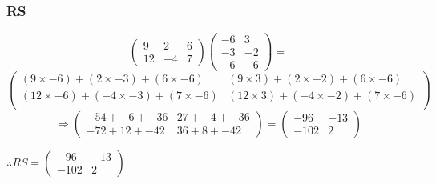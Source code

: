 \documentclass{article}
\begin{document}
\subsubsection{RS}
\[
	\begin{pmatrix}
		9 & 2 & 6\\
		12 & -4 & 7
	\end{pmatrix}
	\begin{pmatrix}
		-6 & 3\\
		-3 & -2\\
		-6 & -6
	\end{pmatrix}
	=
\]
\[
	\begin{pmatrix}
		(9\times-6)+(2\times-3)+(6\times-6) & (9\times3)+(2\times-2)+(6\times-6)\\
		(12\times-6)+(-4\times-3)+(7\times-6) & (12\times3)+(-4\times-2)+(7\times-6)\\
	\end{pmatrix}
\]
\[
	\Rightarrow
	\begin{pmatrix}
		-54+-6+-36 & 27+-4+-36\\
		-72+12+-42 & 36+8+-42
	\end{pmatrix}
	=
	\begin{pmatrix}
		-96 & -13\\
		-102 & 2
	\end{pmatrix}
\]
\begin{center}\vspace{0.5cm}$\therefore
	RS=
	\begin{pmatrix}
		-96 & -13\\
		-102 & 2
	\end{pmatrix}
$\end{center}
\end{document}
